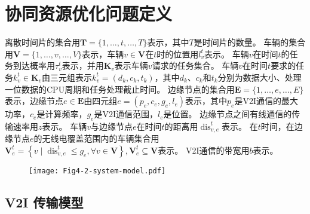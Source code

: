 \section{协同资源优化问题定义}\label{section 4-3}

离散时间片的集合用$\mathbf{T}=\{1, \ldots, t, \ldots, T\}$表示，其中$T$是时间片的数量。
车辆的集合用$\mathbf{V}=\{1, \ldots, v, \ldots, V\}$表示，车辆$v \in \mathbf{V}$在$t$时的位置用$l_{v}^{t}$表示。
车辆$v$在时间$t$的任务到达概率用$\tau_{v}^{t}$表示，并用$\mathbf{K}_{v}$表示车辆$v$请求的任务集合。
车辆$v$在时间$t$要求的任务$k_{v}^{t} \in \mathbf{K}_{v}$由三元组表示$k_{v}^{t}=\left(d_{k}, c_{k}, t_{k}\right)$，其中$d_{k}$、$c_{k}$和$t_{k}$分别为数据大小、处理一位数据的CPU周期和任务处理截止时间。
边缘节点的集合用$\mathbf{E}=\{1, \ldots, e, \ldots, E\}$表示，边缘节点$e \in \mathbf{E}$由四元组$e=\left(p_{e}, c_{e}, g_{e}, l_{e}\right)$表示，其中$p_{e}$是V2I通信的最大功率，$c_{e}$是计算频率，$g_e$是V2I通信范围，$l_{e}$是位置。
边缘节点之间有线通信的传输速率用$z$表示。
车辆$v$与边缘节点$e$在时间$t$的距离用$\operatorname{dis}_{v, e}^{t}$表示。
在$t$时间，在边缘节点$e$的无线电覆盖范围内的车辆集合用$\mathbf{V}_{e}^{t}=\left\{v \mid \operatorname{dis}_{v, e}^{t} \leq g_{e}, \forall v \in \mathbf{V}\right\}, \mathbf{V}_{e}^{t} \subseteq \mathbf{V}$表示。
V2I通信的带宽用$b$表示。

\begin{figure}[h]
\centering
  \texttt{[image: Fig4-2-system-model.pdf]}
  \label{fig 4-2}
\end{figure}

\subsection{V2I 传输模型}

